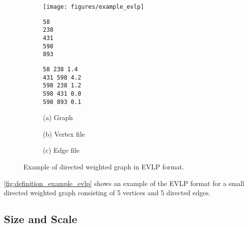 \begin{figure}[t!]
\centering
\begin{subfigure}{0.3\textwidth}
\texttt{[image: figures/example\_evlp]}
\end{subfigure}
\begin{subfigure}{0.3\textwidth}
\begin{Verbatim}[frame=single]
58 
238
431
598
893
\end{Verbatim}
\end{subfigure}
\begin{subfigure}{0.3\textwidth}
\begin{Verbatim}[frame=single]
58 238 1.4
431 598 4.2
598 238 1.2
598 431 0.0
598 893 0.1
\end{Verbatim}
\end{subfigure}
\newline
\newline
\begin{subfigure}{0.3\textwidth}
  \centering
  (a) Graph
\end{subfigure}
\begin{subfigure}{0.3\textwidth}
  \centering
  (b) Vertex file
\end{subfigure}
\begin{subfigure}{0.3\textwidth}
  \centering
  (c) Edge file
\end{subfigure}

\caption{Example of directed weighted graph in EVLP format.}
\label{fig:definition_example_evlp}
\end{figure}

\autoref{fig:definition_example_evlp} shows an example of the EVLP format for a small directed weighted graph consisting of 5 vertices and 5 directed edges.


\subsection{Size and Scale}
\label{sec:definition_scale}

